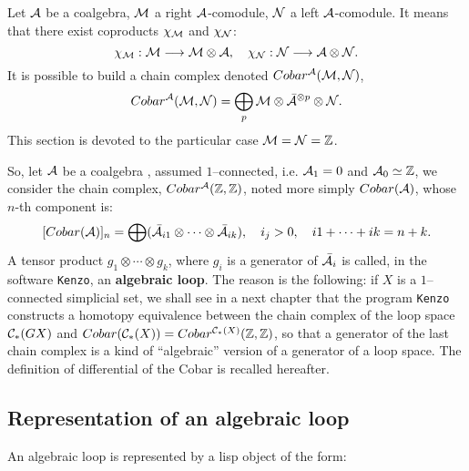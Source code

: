 Let ${\cal A}$ be a coalgebra, ${\cal M}$ a  right ${\cal A}$-comodule, ${\cal N}$ a left ${\cal A}$-comodule.
It means that there exist coproducts $\chi_{\cal M}$ and $\chi_{\cal N}$:
$$\chi_{\cal M}: {\cal M} \longrightarrow {\cal M}\otimes {\cal A},\quad
  \chi_{\cal N}: {\cal N} \longrightarrow {\cal A}\otimes {\cal N}.  $$
It is possible to build a chain complex denoted $Cobar^{\cal A}({\cal M}, {\cal N})$, 
$$Cobar^{\cal A}({\cal M}, {\cal N}) = \bigoplus_p
{\cal M}\otimes {\bar{\cal A}}^{\otimes p} \otimes {\cal N}.$$
This section  is devoted to the particular case ${\cal M}={\cal N}={{\Bbb Z}}$.
\par
So, let ${\cal A}$ be  a coalgebra , assumed $1$--connected, 
i.e. ${\cal A}_1 = 0$ and  ${\cal A}_0 \simeq {{\Bbb Z}}$,
we consider the chain complex, $Cobar^{{\cal A}}({{\Bbb Z}}, {{\Bbb Z}})$, noted more simply  $Cobar({\cal A})$, 
whose $n$-th component is:
$$ [Cobar({\cal A})]_n = \bigoplus ({\bar{\cal A}}_{i1} \otimes \cdots \otimes {\bar{\cal A}}_{ik}),\quad i_j >0, \quad
i1 + \cdots + ik= n+k.$$
A tensor product $g_1 \otimes \cdots \otimes g_k$, where
$g_i$ is a generator of ${\bar{\cal A}}_{i}$ is called, in the software {\tt Kenzo}, 
an {\bf algebraic loop}.
The reason is the following: if $X$ is a $1$--connected simplicial set, we shall see in a next
chapter that the program {\tt Kenzo} constructs
a homotopy equivalence between the chain complex of the loop space ${\cal C}_*(GX)$ 
and $Cobar({\cal C}_*(X)) = Cobar^{{\cal C}_*(X)}({{\Bbb Z}}, {{\Bbb Z}})$,
so that a generator of the last chain complex is a kind of ``algebraic'' version of a generator of a loop space.
The definition of  differential of the Cobar is recalled hereafter.


\subsection {Representation of an algebraic loop}

An algebraic loop is represented by a lisp object of the form:


